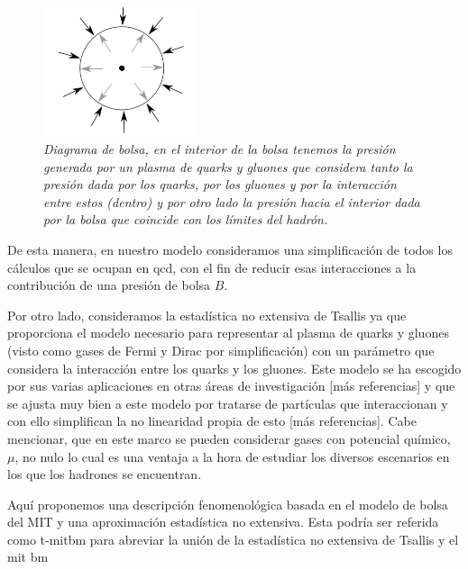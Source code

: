 \begin{figure}
\centering
\includegraphics[width=0.4\textwidth]{./Images/Bag model.png}
\caption[Diagrama de bolsa]{\emph{Diagrama de bolsa, en el interior de la bolsa tenemos la presión generada por un plasma de quarks y gluones que considera tanto la presión dada por los quarks, por los gluones y por la interacción entre estos (dentro) y por otro lado la presión hacia el interior dada por la bolsa que coincide con los límites del hadrón.}}
\label{fig: Bolsa}
\end{figure}

De esta manera, en nuestro modelo consideramos una simplificación de todos los cálculos que se ocupan en \acrshort{qcd}, con el fin de reducir esas interacciones a la contribución de una presión de bolsa $B$.

Por otro lado, consideramos la estadística no extensiva de Tsallis ya que proporciona el modelo necesario para representar al plasma de quarks y gluones (visto como gases de Fermi y Dirac por simplificación) con un parámetro que considera la interacción entre los quarks y los gluones. Este modelo se ha escogido por sus varias aplicaciones en otras áreas de investigación [más referencias] y que se ajusta muy bien a este modelo por tratarse de partículas que interaccionan y con ello simplifican la no linearidad propia de esto [más referencias]. Cabe mencionar, que en este marco se pueden considerar gases con potencial químico, $\mu$, no nulo lo cual es una ventaja a la hora de estudiar los diversos escenarios en los que los hadrones se encuentran.


Aquí proponemos una descripción fenomenológica basada en el modelo de bolsa del MIT \cite{Chodos_1974,Chodos1974a} y una aproximación estadística no extensiva. Esta podría ser referida como \acrshort{t-mitbm} para abreviar la unión de la estadística no extensiva de Tsallis y el \acrshort{mit} \acrshort{bm} \cite{Barboza_Mendoza_2019}


